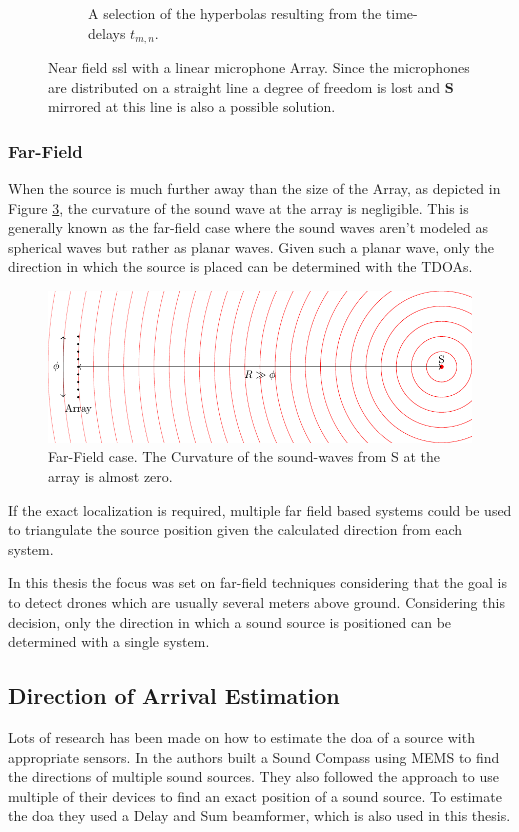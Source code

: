 \begin{figure}[ht]
\begin{subfigure}[b]{0.45\textwidth}
		\caption{A selection of the hyperbolas resulting from the time-delays $t_{m,n}$.}
		\label{ssl:fig:hyperbola}
	\end{subfigure}
	\caption{Near field \acrshort{ssl} with a linear microphone Array.
		Since the microphones are distributed on a straight line a degree of freedom is lost and
		$\bm{S}$ mirrored at this line is also a possible solution.}
	\label{fig:three graphs}
\end{figure}

\subsubsection{Far-Field}
When the source is much further away than the size of the Array, as depicted
in Figure \ref{ssl:fig:far field}, the curvature of the sound wave at the array is negligible.
This is generally known as the far-field case where the sound waves aren't
modeled as spherical waves but rather as planar waves.
Given such a planar wave, only the direction in which the source is placed can be determined with the TDOAs.

\begin{figure}[ht]
	\centering
	\includegraphics[]{images/3_source_localization/FarField.pdf}
	\caption{Far-Field case. The Curvature of the sound-waves from S at the array
		is almost zero.}
	\label{ssl:fig:far field}
\end{figure}

If the exact localization is required, multiple far field based systems could be
used to triangulate the source position given the calculated direction from each system.

In this thesis the focus was set on far-field techniques considering that the
goal is to detect drones which are usually several meters above ground.
Considering this decision, only the direction in which a sound source is positioned
can be determined with a single system.
\newpage
\subsection{Direction of Arrival Estimation}
Lots of research has been made on how to estimate the \acrfull{doa} of a source
with appropriate sensors.
In \cite{s140201918} the authors built a Sound Compass
using MEMS to find the directions of multiple sound sources.
They also followed the approach to use multiple of their devices to
find an exact position of a sound source.
To estimate the \acrshort{doa} they used a Delay and Sum beamformer,
which is also used in this thesis.

